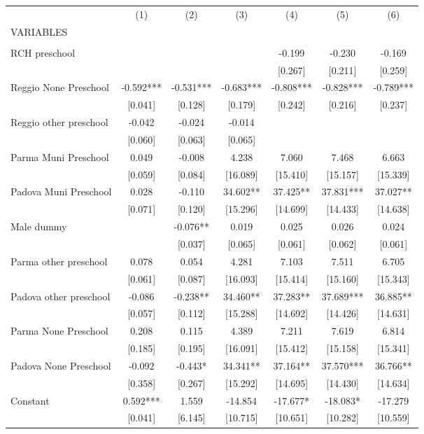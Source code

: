 \begin{tabular}{lcccccc} \hline
 & (1) & (2) & (3) & (4) & (5) & (6) \\
VARIABLES &  &  &  &  &  &  \\ \hline
 &  &  &  &  &  &  \\
RCH preschool &  &  &  & -0.199 & -0.230 & -0.169 \\
 &  &  &  & [0.267] & [0.211] & [0.259] \\
Reggio None Preschool & -0.592*** & -0.531*** & -0.683*** & -0.808*** & -0.828*** & -0.789*** \\
 & [0.041] & [0.128] & [0.179] & [0.242] & [0.216] & [0.237] \\
Reggio other preschool & -0.042 & -0.024 & -0.014 &  &  &  \\
 & [0.060] & [0.063] & [0.065] &  &  &  \\
Parma Muni Preschool & 0.049 & -0.008 & 4.238 & 7.060 & 7.468 & 6.663 \\
 & [0.059] & [0.084] & [16.089] & [15.410] & [15.157] & [15.339] \\
Padova Muni Preschool & 0.028 & -0.110 & 34.602** & 37.425** & 37.831*** & 37.027** \\
 & [0.071] & [0.120] & [15.296] & [14.699] & [14.433] & [14.638] \\
Male dummy &  & -0.076** & 0.019 & 0.025 & 0.026 & 0.024 \\
 &  & [0.037] & [0.065] & [0.061] & [0.062] & [0.061] \\
Parma other preschool & 0.078 & 0.054 & 4.281 & 7.103 & 7.511 & 6.705 \\
 & [0.061] & [0.087] & [16.093] & [15.414] & [15.160] & [15.343] \\
Padova other preschool & -0.086 & -0.238** & 34.460** & 37.283** & 37.689*** & 36.885** \\
 & [0.057] & [0.112] & [15.288] & [14.692] & [14.426] & [14.631] \\
Parma None Preschool & 0.208 & 0.115 & 4.389 & 7.211 & 7.619 & 6.814 \\
 & [0.185] & [0.195] & [16.091] & [15.412] & [15.158] & [15.341] \\
Padova None Preschool & -0.092 & -0.443* & 34.341** & 37.164** & 37.570*** & 36.766** \\
 & [0.358] & [0.267] & [15.292] & [14.695] & [14.430] & [14.634] \\
Constant & 0.592*** & 1.559 & -14.854 & -17.677* & -18.083* & -17.279 \\
 & [0.041] & [6.145] & [10.715] & [10.651] & [10.282] & [10.559] \\

\end{tabular}
